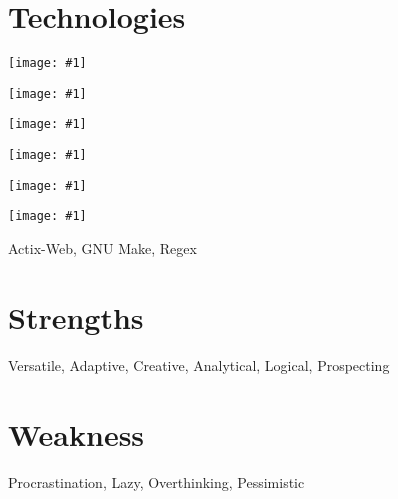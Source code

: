\documentclass[12pt, a4paper]{article}
\newcommand{\hlogo}[2]{
	\texttt{[image: \#1]}
}
\begin{document}
\begin{multicols}{2}
		\section{Technologies}
		\newcommand{\lht}{1.5em}
		\parbox{19em}{
			\hlogo{vim}{\lht} 
			\hlogo{gitFull}{\lht} 
			\hlogo{dockerFull}{\lht} 
			\hlogo{reactFull}{\lht} 
			\hlogo{mongoFull}{\lht} 
			\hlogo{mysqlFull}{\lht} 
			Actix-Web, GNU Make, Regex
		}
		\section{Strengths}
			\parbox{19em}{Versatile, Adaptive, Creative, Analytical, Logical, Prospecting}
		\section{Weakness}
			\parbox{19em}{Procrastination, Lazy, Overthinking, Pessimistic}
	\end{multicols}
\end{document}
